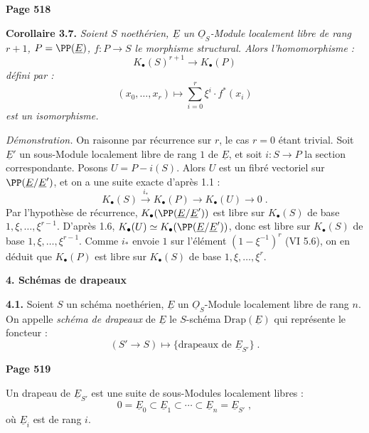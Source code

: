 \newpage
\noindent\textbf{Page 518}

\smallskip
\noindent\textbf{Corollaire 3.7.} \textit{Soient $S$ noeth\'erien, $\underline{E}$ un $\underline{O}_S$-Module localement libre de rang $r+1$, $P = \PP(\underline{E})$, $f : P \longrightarrow S$ le morphisme structural. Alors l'homomorphisme :
\[
K_\bullet(S)^{r+1} \longrightarrow K_\bullet(P)
\]
d\'efini par :
\[
(x_0, \ldots, x_r) \longmapsto \sum_{i=0}^r \xi^i \cdot f^*(x_i)
\]
est un isomorphisme.}

\textit{D\'emonstration.} On raisonne par r\'ecurrence sur $r$, le cas $r=0$ \'etant trivial. Soit $\underline{E}'$ un sous-Module localement libre de rang $1$ de $\underline{E}$, et soit $i : S \longrightarrow P$ la section correspondante. Posons $U = P - i(S)$. Alors $U$ est un fibr\'e vectoriel sur $\PP(\underline{E}/\underline{E}')$, et on a une suite exacte d'apr\`es 1.1 :
\[
K_\bullet(S) \xrightarrow{\;i_*\;} K_\bullet(P) \longrightarrow K_\bullet(U) \longrightarrow 0\;.
\]
Par l'hypoth\`ese de r\'ecurrence, $K_\bullet(\PP(\underline{E}/\underline{E}'))$ est libre sur $K_\bullet(S)$ de base $1, \xi, \ldots, \xi^{r-1}$. D'apr\`es 1.6, $K_\bullet(U) \simeq K_\bullet(\PP(\underline{E}/\underline{E}'))$, donc est libre sur $K_\bullet(S)$ de base $1, \xi, \ldots, \xi^{r-1}$. Comme $i_*$ envoie $1$ sur l'\'el\'ement $(1 - \xi^{-1})^r$ (VI 5.6), on en d\'eduit que $K_\bullet(P)$ est libre sur $K_\bullet(S)$ de base $1, \xi, \ldots, \xi^r$.

\smallskip
\noindent\textbf{4. Sch\'emas de drapeaux}

\smallskip
\noindent\textbf{4.1.} Soient $S$ un sch\'ema noeth\'erien, $\underline{E}$ un $\underline{O}_S$-Module localement libre de rang $n$. On appelle \textit{sch\'ema de drapeaux} de $\underline{E}$ le $S$-sch\'ema $\mathrm{Drap}(\underline{E})$ qui repr\'esente le foncteur :
\[
(S' \longrightarrow S) \longmapsto \{\text{drapeaux de } \underline{E}_{S'}\}\;.
\]

\newpage
\noindent\textbf{Page 519}

Un drapeau de $\underline{E}_{S'}$ est une suite de sous-Modules localement libres :
\[
0 = \underline{E}_0 \subset \underline{E}_1 \subset \cdots \subset \underline{E}_n = \underline{E}_{S'}\;,
\]
o\`u $\underline{E}_i$ est de rang $i$.

